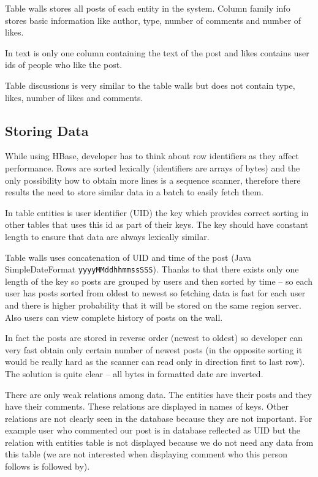 \documentclass{llncs}
\begin{document}
Table walls stores all posts of each entity in the system.  Column family info
stores basic information like author, type, number of comments and number of
likes.

In text is only one column containing the text of the post and likes contains
user ids of people who like the post.

Table discussions is very similar to the table walls but does not contain
type, likes, number of likes and comments.

\subsection{Storing Data}
While using HBase, developer has to think about row identifiers as they affect
performance. Rows are sorted lexically (identifiers are arrays of bytes) and
the only possibility how to obtain more lines is a sequence scanner, therefore
there results the need to store similar data in a batch to easily fetch them.

In table entities is user identifier (UID) the key which provides correct
sorting in other tables that uses this id as part of their keys. The key
should have constant length to ensure that data are always lexically similar.

Table walls uses concatenation of UID and time of the post (Java
SimpleDateFormat \texttt{yyyyMMddhhmmssSSS}). Thanks to that there exists only
one length of the key so posts are grouped by users and then sorted by time --
so each user has posts sorted from oldest to newest so fetching data is fast
for each user and there is higher probability that it will be stored on the
same region server.  Also users can view complete history of posts on the
wall.

In fact the posts are stored in reverse order (newest to oldest) so developer
can very fast obtain only certain number of newest posts (in the opposite
sorting it would be really hard as the scanner can read only in direction
first to last row). The solution is quite clear -- all bytes in formatted date
are inverted.

There are only weak relations among data. The entities have their posts and
they have their comments. These relations are displayed in names of keys.
Other relations are not clearly seen in the database because they are not
important.  For example user who commented our post is in database reflected
as UID but the relation with entities table is not displayed because we do not
need any data from this table (we are not interested when displaying comment
who this person follows is followed by).
\end{document}
